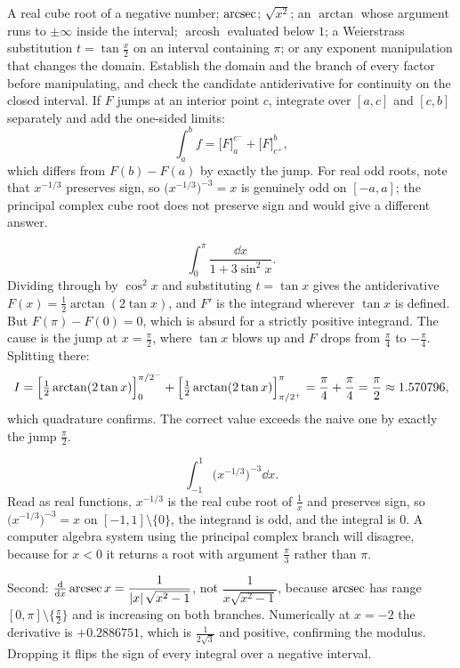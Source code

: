 \cue A real cube root of a negative number; $\operatorname{arcsec}$; $\sqrt{x^{2}}$; an $\arctan$ whose argument runs to $\pm\infty$ inside the interval; $\operatorname{arcosh}$ evaluated below $1$; a Weierstrass substitution $t=\tan\tfrac x2$ on an interval containing $\pi$; or any exponent manipulation that changes the domain.
\method Establish the domain and the branch of every factor before manipulating, and check the candidate antiderivative for continuity on the closed interval. If $F$ jumps at an interior point $c$, integrate over $[a,c]$ and $[c,b]$ separately and add the one-sided limits:
\[\int_a^bf=\bigl[F\bigr]_a^{c^{-}}+\bigl[F\bigr]_{c^{+}}^{b},\]
which differs from $F(b)-F(a)$ by exactly the jump. For real odd roots, note that $x^{-1/3}$ preserves sign, so $\bigl(x^{-1/3}\bigr)^{-3}=x$ is genuinely odd on $[-a,a]$; the principal complex cube root does not preserve sign and would give a different answer.

\begin{worked}
\[\int_0^{\pi}\frac{\dd x}{1+3\sin^{2}x}.\]
Dividing through by $\cos^{2}x$ and substituting $t=\tan x$ gives the antiderivative $F(x)=\tfrac12\arctan(2\tan x)$, and $F'$ is the integrand wherever $\tan x$ is defined. But $F(\pi)-F(0)=0$, which is absurd for a strictly positive integrand. The cause is the jump at $x=\tfrac{\pi}{2}$, where $\tan x$ blows up and $F$ drops from $\tfrac{\pi}{4}$ to $-\tfrac{\pi}{4}$. Splitting there:
\[I=\Bigl[\tfrac12\arctan(2\tan x)\Bigr]_0^{\pi/2^{-}}+\Bigl[\tfrac12\arctan(2\tan x)\Bigr]_{\pi/2^{+}}^{\pi}=\frac{\pi}{4}+\frac{\pi}{4}=\frac{\pi}{2}\approx1.570796,\]
which quadrature confirms. The correct value exceeds the naive one by exactly the jump $\tfrac{\pi}{2}$.
\end{worked}

\begin{worked}
\[\int_{-1}^{1}\bigl(x^{-1/3}\bigr)^{-3}\dd x.\]
Read as real functions, $x^{-1/3}$ is the real cube root of $\tfrac1x$ and preserves sign, so $\bigl(x^{-1/3}\bigr)^{-3}=x$ on $[-1,1]\setminus\{0\}$, the integrand is odd, and the integral is $0$. A computer algebra system using the principal complex branch will disagree, because for $x<0$ it returns a root with argument $\tfrac{\pi}{3}$ rather than $\pi$.

Second: $\frac{\mathrm{d}}{\mathrm{d}x}\operatorname{arcsec} x=\dfrac{1}{\left\lvert x\right\rvert\sqrt{x^{2}-1}}$, not $\dfrac{1}{x\sqrt{x^{2}-1}}$, because $\operatorname{arcsec}$ has range $[0,\pi]\setminus\{\tfrac{\pi}{2}\}$ and is increasing on both branches. Numerically at $x=-2$ the derivative is $+0.2886751$, which is $\tfrac{1}{2\sqrt3}$ and positive, confirming the modulus. Dropping it flips the sign of every integral over a negative interval.
\end{worked}


